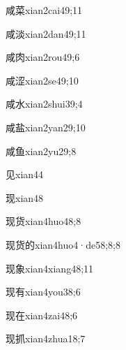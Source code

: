 \begin{verbete}{咸菜}{xian2cai4}{9;11}
\end{verbete}
\begin{verbete}{咸淡}{xian2dan4}{9;11}
\end{verbete}
\begin{verbete}{咸肉}{xian2rou4}{9;6}
\end{verbete}
\begin{verbete}{咸涩}{xian2se4}{9;10}
\end{verbete}
\begin{verbete}{咸水}{xian2shui3}{9;4}
\end{verbete}
\begin{verbete}{咸盐}{xian2yan2}{9;10}
\end{verbete}
\begin{verbete}{咸鱼}{xian2yu2}{9;8}
\end{verbete}
\begin{verbete}{见}{xian4}{4}
\end{verbete}
\begin{verbete}{现}{xian4}{8}
\end{verbete}
\begin{verbete}{现货}{xian4huo4}{8;8}
\end{verbete}
\begin{verbete}{现货的}{xian4huo4·de5}{8;8;8}
\end{verbete}
\begin{verbete}{现象}{xian4xiang4}{8;11}
\end{verbete}
\begin{verbete}{现有}{xian4you3}{8;6}
\end{verbete}
\begin{verbete}{现在}{xian4zai4}{8;6}
\end{verbete}
\begin{verbete}{现抓}{xian4zhua1}{8;7}
\end{verbete}
